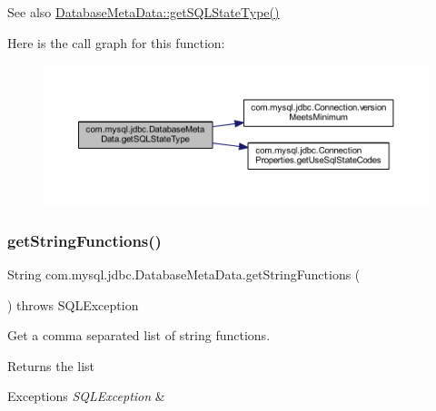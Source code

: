 \begin{DoxySeeAlso}{See also}
\mbox{\hyperlink{classcom_1_1mysql_1_1jdbc_1_1_database_meta_data_a75eb814c9d9198a66e8ebf6b78002833}{Database\+Meta\+Data\+::get\+S\+Q\+L\+State\+Type()}} 
\end{DoxySeeAlso}
Here is the call graph for this function\+:
\nopagebreak
\begin{figure}[H]
\begin{center}
\leavevmode
\includegraphics[width=350pt]{classcom_1_1mysql_1_1jdbc_1_1_database_meta_data_a75eb814c9d9198a66e8ebf6b78002833_cgraph}
\end{center}
\end{figure}
\mbox{\label{classcom_1_1mysql_1_1jdbc_1_1_database_meta_data_ab51ae5d381fa7217774f5426ec79793a}} 
\subsubsection{\texorpdfstring{get\+String\+Functions()}{getStringFunctions()}}
{\footnotesize\ttfamily String com.\+mysql.\+jdbc.\+Database\+Meta\+Data.\+get\+String\+Functions (\begin{DoxyParamCaption}{ }\end{DoxyParamCaption}) throws S\+Q\+L\+Exception}

Get a comma separated list of string functions.

\begin{DoxyReturn}{Returns}
the list 
\end{DoxyReturn}

\begin{DoxyExceptions}{Exceptions}
{\em S\+Q\+L\+Exception} & \\
\hline
\end{DoxyExceptions}
\mbox{\label{classcom_1_1mysql_1_1jdbc_1_1_database_meta_data_a0292d35306f16ab85d756fc7f3c0a3c7}} 
